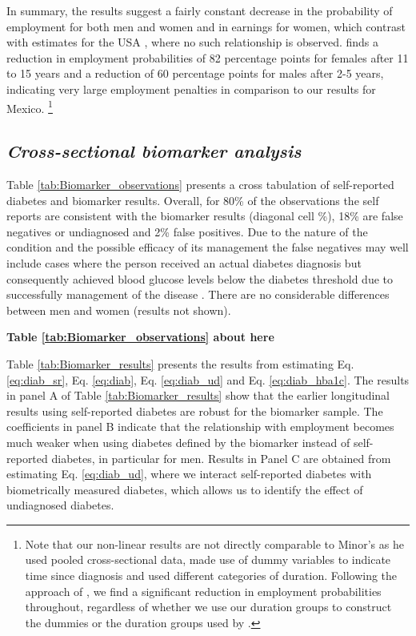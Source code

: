 \documentclass[12pt,english]{article}
\begin{document}
In summary, the results suggest a fairly constant decrease in the probability of employment for both men and women and in earnings for women, which contrast with estimates for the USA \parencite{Minor2013}, where no such relationship is observed.  \textcite{Minor2013} finds a reduction in employment probabilities of 82 percentage points for females after 11 to 15 years and a reduction of 60 percentage points for males after 2-5 years, indicating very large employment penalties in comparison to our results for Mexico. \footnote{Note that our non-linear results are not directly comparable to Minor's as he used pooled cross-sectional data, made use of dummy variables to indicate time since diagnosis and used different categories of duration. Following the approach of \textcite{Minor2013}, we find a significant reduction in employment probabilities throughout, regardless of whether we use our duration groups to construct the dummies or the duration groups used by \textcite{Minor2013}.} 




\FloatBarrier

\subsection{\textit{Cross-sectional biomarker analysis}}


Table \ref{tab:Biomarker_observations} presents a cross tabulation of self-reported diabetes and biomarker results. Overall, for 80\% of the observations the self reports are consistent with the biomarker results (diagonal cell \%), 18\% are false negatives or undiagnosed and 2\% false positives. Due to the nature of the condition and the possible efficacy of its management the false negatives may well include cases where the person received an actual diabetes diagnosis but consequently achieved blood glucose levels below the diabetes threshold due to successfully management of the disease \parencite{Flores-Hernandez2015}.  There are no considerable differences between men and women (results not shown). 
\begin{center}
	\textbf{Table \ref{tab:Biomarker_observations} about here}
\end{center}


Table \ref{tab:Biomarker_results} presents the results from estimating Eq. \ref{eq:diab_sr}, Eq. \ref{eq:diab}, Eq. \ref{eq:diab_ud} and Eq. \ref{eq:diab_hba1c}. The results in panel A of Table \ref{tab:Biomarker_results} show that the earlier longitudinal results using self-reported diabetes are robust for the biomarker sample. The coefficients in panel B indicate that the relationship with employment becomes much weaker when using diabetes defined by the biomarker instead of self-reported diabetes, in particular for men. Results in Panel C are obtained from estimating Eq. \ref{eq:diab_ud}, where we interact self-reported diabetes with biometrically measured diabetes, which allows us to identify the effect of undiagnosed diabetes. 
\end{document}
